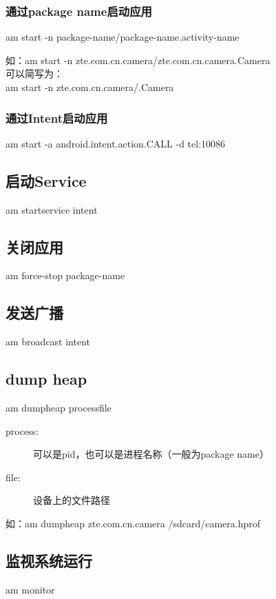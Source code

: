 ﻿\documentclass{article}
\begin{document}
  \subsubsection[通过package name启动应用]{通过package name启动应用}
  am start -n \lt package-name\gt/\lt package-name.activity-name\gt
  
  如：am start -n zte.com.cn.camera/zte.com.cn.camera.Camera\\
  可以简写为：\\
  am start -n zte.com.cn.camera/.Camera
  
  \subsubsection[通过Intent启动应用]{通过Intent启动应用}
  am start -a android.intent.action.CALL -d tel:10086
  
  \subsection[启动Service]{启动Service}
  am startservice \lt intent\gt
  
  \subsection[关闭应用]{关闭应用}
  am force-stop \lt package-name\gt
  
  \subsection[发送广播]{发送广播}
  am broadcast \lt intent\gt
  
  \subsection[dump heap]{dump heap}
  am dumpheap \lt process\gt \lt file\gt
  
  \begin{description}
    \item[process:] 可以是pid，也可以是进程名称（一般为package name）
    \item[file:] 设备上的文件路径
  \end{description}
  如：am dumpheap zte.com.cn.camera /sdcard/camera.hprof
  
  \subsection[监视系统运行]{监视系统运行}
  am monitor
  
\end{document}

